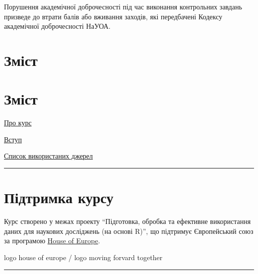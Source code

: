 \documentclass[
  letterpaper,
  DIV=11,
  numbers=noendperiod]{scrreprt}
\newenvironment{Shaded}{\begin{snugshade}}{\end{snugshade}}
\begin{document}
Порушення академічної доброчесності під час виконання контрольних
завдань призведе до втрати балів або вживання заходів, які передбачені
Кодексу академічної доброчесності НаУОА.

\hypertarget{ux437ux43cux456ux441ux442}{%
\section*{Зміст}\label{ux437ux43cux456ux441ux442}}

\begin{Shaded}
\begin{Highlighting}[]

\end{Highlighting}
\end{Shaded}

\hypertarget{ux437ux43cux456ux441ux442-1}{%
\section*{Зміст}\label{ux437ux43cux456ux441ux442-1}}

\protect\hyperlink{ux43fux440ux43e-ux43aux443ux440ux441}{Про курс}

\protect\hyperlink{ux432ux441ux442ux443ux43f}{Вступ}

\protect\hyperlink{ux441ux43fux438ux441ux43eux43a-ux432ux438ux43aux43eux440ux438ux441ux442ux430ux43dux438ux445-ux434ux436ux435ux440ux435ux43b}{Список
використаних джерел}

\begin{center}\rule{0.5\linewidth}{0.5pt}\end{center}

\hypertarget{ux43fux456ux434ux442ux440ux438ux43cux43aux430-ux43aux443ux440ux441ux443}{%
\section*{Підтримка
курсу}\label{ux43fux456ux434ux442ux440ux438ux43cux43aux430-ux43aux443ux440ux441ux443}}

Курс створено у межах проекту ``Підготовка, обробка та ефективне
використання даних для наукових досліджень (на основі R)'', що підтримує
Європейський союз за програмою
\href{https://houseofeurope.org.ua/}{House of Europe}.

logo house of europe / logo moving forvard together

\begin{center}\rule{0.5\linewidth}{0.5pt}\end{center}
\end{document}
